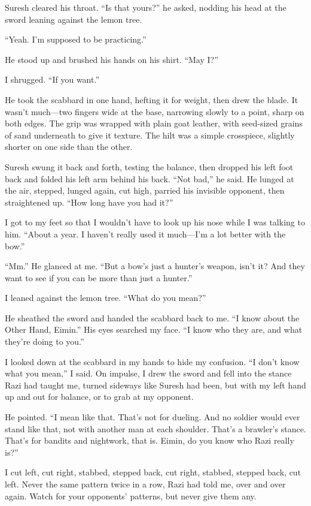 Suresh cleared his throat.  ``Is that yours?''  he asked, nodding his
head at the sword leaning against the lemon tree.

``Yeah.  I'm supposed to be practicing.''

He stood up and brushed his hands on his shirt.  ``May I?''

I shrugged.  ``If you want.''

He took the scabbard in one hand, hefting it for weight, then drew the
blade.  It wasn't much---two fingers wide at the base, narrowing
slowly to a point, sharp on both edges.  The grip was wrapped with
plain goat leather, with seed-sized grains of sand underneath to give
it texture.  The hilt was a simple crosspiece, slightly shorter on one
side than the other.

Suresh swung it back and forth, testing the balance, then dropped his
left foot back and folded his left arm behind his back.  ``Not bad,'' he
said.  He lunged at the air, stepped, lunged again, cut high, parried
his invisible opponent, then straightened up.  ``How long have you had
it?''

I got to my feet so that I wouldn't have to look up his nose while I
was talking to him.  ``About a year.  I haven't really used it
much---I'm a lot better with the bow.''

``Mm.''  He glanced at me.  ``But a bow's just a hunter's weapon, isn't
it?  And they want to see if you can be more than just a hunter.''

I leaned against the lemon tree.  ``What do you mean?''

He sheathed the sword and handed the scabbard back to me.  ``I know
about the Other Hand, Eimin.''  His eyes searched my face.  ``I know who
they are, and what they're doing to you.''

I looked down at the scabbard in my hands to hide my confusion.  ``I
don't know what you mean,'' I said.  On impulse, I drew the sword and
fell into the stance Razi had taught me, turned sideways like Suresh
had been, but with my left hand up and out for balance, or to grab at
my opponent.

He pointed.  ``I mean like that.  That's not for dueling.  And no
soldier would ever stand like that, not with another man at each
shoulder.  That's a brawler's stance.  That's for bandits and
nightwork, that is.  Eimin, do you know who Razi really is?''

I cut left, cut right, stabbed, stepped back, cut right, stabbed,
stepped back, cut left.  Never the same pattern twice in a row, Razi
had told me, over and over again.  Watch for your opponents' patterns,
but never give them any.

